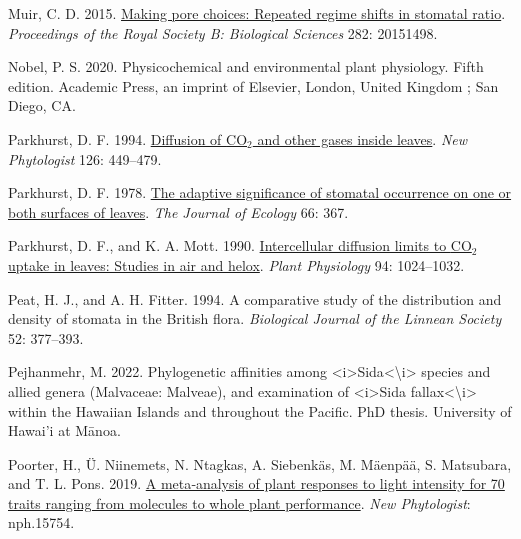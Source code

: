\documentclass[
  letterpaper,
  DIV=11,
  numbers=noendperiod]{scrartcl}
\newlength{\cslhangindent}
\newlength{\cslentryspacingunit} %
\newenvironment{CSLReferences}[2] %
 {%
  \setlength{\parindent}{0pt}
  \ifodd #1
  \let\oldpar\par
  \def\par{\hangindent=\cslhangindent\oldpar}
  \fi
  \setlength{\parskip}{#2\cslentryspacingunit}
 }%
 {}
\begin{document}
\begin{CSLReferences}{1}{0}
\leavevmode{}%
Muir, C. D. 2015. \href{https://doi.org/10.1098/rspb.2015.1498}{Making
pore choices: Repeated regime shifts in stomatal ratio}.
\emph{Proceedings of the Royal Society B: Biological Sciences} 282:
20151498.

\leavevmode{}%
Nobel, P. S. 2020. Physicochemical and environmental plant physiology.
Fifth edition. Academic Press, an imprint of Elsevier, London, United
Kingdom ; San Diego, CA.

\leavevmode{}%
Parkhurst, D. F. 1994.
\href{http://www.jstor.org/stable/2557929}{Diffusion of
{CO}\(_{\textrm{2}}\) and other gases inside leaves}. \emph{New
Phytologist} 126: 449--479.

\leavevmode{}%
Parkhurst, D. F. 1978. \href{https://doi.org/10.2307/2259142}{The
adaptive significance of stomatal occurrence on one or both surfaces of
leaves}. \emph{The Journal of Ecology} 66: 367.

\leavevmode{}%
Parkhurst, D. F., and K. A. Mott. 1990.
\href{https://doi.org/10.1104/pp.94.3.1024}{Intercellular diffusion
limits to {CO}\(_{\textrm{2}}\) uptake in leaves: Studies in air and
helox}. \emph{Plant Physiology} 94: 1024--1032.

\leavevmode{}%
Peat, H. J., and A. H. Fitter. 1994. A comparative study of the
distribution and density of stomata in the {British} flora.
\emph{Biological Journal of the Linnean Society} 52: 377--393.

\leavevmode{}%
Pejhanmehr, M. 2022. Phylogenetic affinities among
{\textless{}}i{\textgreater{}}{Sida}{\textless{}}{\textbackslash{}}i{\textgreater{}}
species and allied genera ({Malvaceae}: {Malveae}), and examination of
{\textless{}}i{\textgreater{}}{Sida}
fallax{\textless{}}{\textbackslash{}}i{\textgreater{}} within the
{Hawaiian} {Islands} and throughout the {Pacific}. PhD thesis.
University of Hawai'i at Mānoa.

\leavevmode{}%
Poorter, H., Ü. Niinemets, N. Ntagkas, A. Siebenkäs, M. Mäenpää, S.
Matsubara, and T. L. Pons. 2019.
\href{https://doi.org/10.1111/nph.15754}{A meta‐analysis of plant
responses to light intensity for 70 traits ranging from molecules to
whole plant performance}. \emph{New Phytologist}: nph.15754.


\end{CSLReferences}
\end{document}
